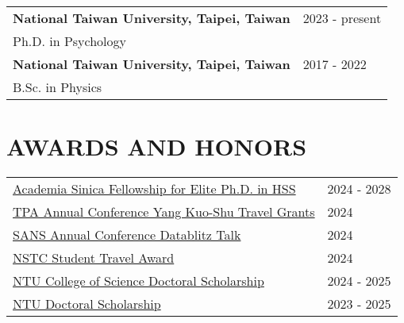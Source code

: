 \documentclass[a4paper,12pt]{article}
\begin{document}
\begin{flushright}
\begin{tabular}{@{}p{}@{}p{}@{}}
    \textbf{National Taiwan University, Taipei, Taiwan} & \hfill 2023 - present \\
    Ph.D. in Psychology & \\[6pt]
    \textbf{National Taiwan University, Taipei, Taiwan} & \hfill 2017 - 2022 \\
    B.Sc. in Physics & \\
\end{tabular}
\end{flushright}

\section*{AWARDS AND HONORS}
\begin{flushright}
\begin{tabular}{@{}p{}@{}p{}@{}}
\href{https://www.sinica.edu.tw/en/News_Content/56/2728}{Academia Sinica Fellowship for Elite Ph.D. in HSS} & \hfill 2024 - 2028 \\[2pt]
\href{https://www.tpa-tw.org/post/2024travel-grant}{TPA Annual Conference Yang Kuo-Shu Travel Grants} & \hfill 2024\\[2pt]
\href{https://socialaffectiveneuro.org/wp-content/uploads/2024/05/SANS-Conference-2024_Program_Final.pdf}{SANS Annual Conference Datablitz Talk} & \hfill 2024\\[2pt]
\href{https://www.nstc.gov.tw/sci/ch/detail/259f99f5-51ce-4582-8546-9d7caee96871}{NSTC Student Travel Award}  & \hfill 2024\\[2pt]
\href{https://www.science.ntu.edu.tw/file/rule50.pdf}{NTU College of Science Doctoral Scholarship}  & \hfill 2024 - 2025\\[2pt]
\href{https://ord.ntu.edu.tw/w/ordntu/GW_20072012180521920/}{NTU Doctoral Scholarship}  & \hfill 2023 - 2025\\[2pt]
\end{tabular}
\end{flushright}
\end{document}
